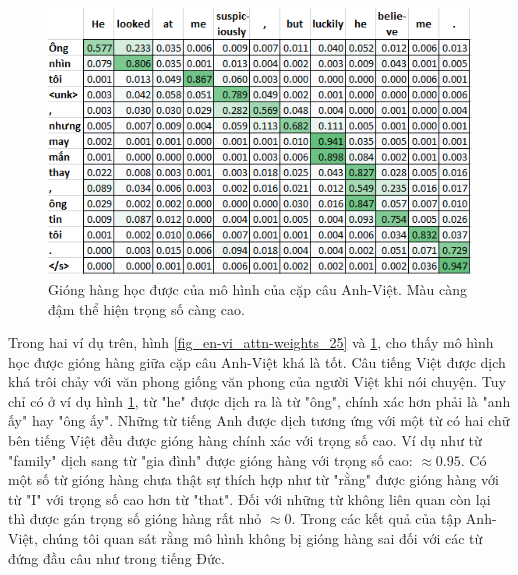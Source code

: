 \begin{figure}
	\centering
	\includegraphics[width=1.0\textwidth]{en-vi_attn-weights_68.png}
	\caption[Gióng hàng học được của mô hình của cặp câu Anh-Việt.]{Gióng hàng học được của mô hình của cặp câu Anh-Việt. Màu càng đậm thể hiện trọng số càng cao.}
	\label{fig_en-vi_attn-weights_68}
\end{figure}

Trong hai ví dụ trên, hình \ref{fig_en-vi_attn-weights_25} và \ref{fig_en-vi_attn-weights_68}, cho thấy mô hình học được gióng hàng giữa cặp câu Anh-Việt khá là tốt. Câu tiếng Việt được dịch khá trôi chảy với văn phong giống văn phong của người Việt khi nói chuyện. Tuy chỉ có ở ví dụ hình \ref{fig_en-vi_attn-weights_68}, từ "he" được dịch ra là từ "ông", chính xác hơn phải là "anh ấy" hay "ông ấy". Những từ tiếng Anh được dịch tương ứng với một từ có hai chữ bên tiếng Việt đều được gióng hàng chính xác với trọng số cao. Ví dụ như từ "family" dịch sang từ "gia đình" được gióng hàng với trọng số cao: $\approx 0.95$. Có một số từ gióng hàng chưa thật sự thích hợp như từ "rằng" được gióng hàng với từ "I" với trọng số cao hơn từ "that". Đối với những từ không liên quan còn lại thì được gán trọng số gióng hàng rất nhỏ $\approx 0$. Trong các kết quả của tập Anh-Việt, chúng tôi quan sát rằng mô hình không bị gióng hàng sai đối với các từ đứng đầu câu như trong tiếng Đức.